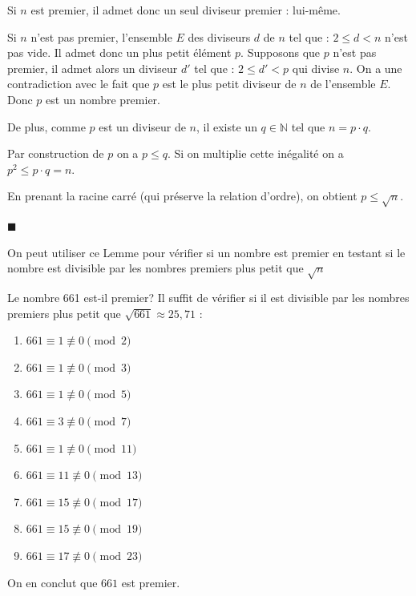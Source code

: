 \begin{demonstration}
	

 Si $n$ est premier, il admet donc un seul diviseur premier : lui-même.

\smallskip

Si $n$ n'est pas premier, l'ensemble $E$ des diviseurs $d$ de $n$ tel que : $2 \le d < n$ n'est pas vide.
Il admet donc un plus petit élément $p$. Supposons que $p$ n'est pas premier, il admet alors un diviseur $d'$ tel que : $2 \le d' < p$ qui divise $n$. On a une contradiction avec le fait que $p$ est le plus petit diviseur de $n$ de l'ensemble $E$. Donc $p$ est un nombre premier.

\smallskip

De plus, comme $p$ est un diviseur de $n$, il existe un $q \in \mathbb{N}$ tel que $n = p \cdot q$.

\smallskip

Par construction de $p$ on a $p \le q$. Si on multiplie cette inégalité on a $p^2 \le p \cdot q = n$.

\smallskip

En prenant la racine carré (qui préserve la relation d'ordre), on obtient $p \le \sqrt{n}$.


\hfill $\blacksquare$
\
\end{demonstration}

\vspace{5mm}

\begin{remarque}
	On peut utiliser ce Lemme pour vérifier si un nombre est premier en testant si le nombre est divisible par les nombres premiers plus petit que $\sqrt{n}$
\end{remarque}

\begin{exemple}
	Le nombre 661 est-il premier? Il suffit de vérifier si il est divisible par les nombres premiers plus petit que $\sqrt{661} \approx 25{,}71$ :
	\begin{enumerate}[label=\textnormal{(\alph*)}, leftmargin=1.5cm]
		\item $661 \equiv 1 \not\equiv 0 \pmod 2$
		\item $661 \equiv 1 \not\equiv 0 \pmod 3$
		\item $661 \equiv 1 \not\equiv 0 \pmod 5$
		\item $661 \equiv 3 \not\equiv 0 \pmod 7$
		\item $661 \equiv 1 \not\equiv 0 \pmod{11}$
		\item $661 \equiv 11 \not\equiv 0 \pmod{13}$
		\item $661 \equiv 15 \not\equiv 0 \pmod{17}$
		\item $661 \equiv 15 \not\equiv 0 \pmod{19}$
		\item $661 \equiv 17 \not\equiv 0 \pmod{23}$
	\end{enumerate}
	
	\vspace{0.2cm}
	On en conclut que $661$ est premier.
	
\end{exemple}

